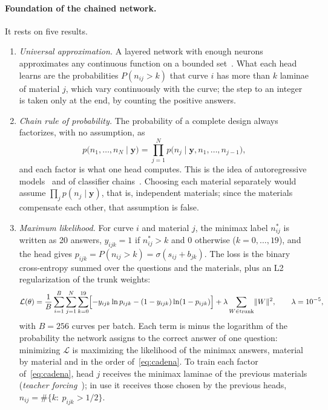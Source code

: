 \paragraph{Foundation of the chained network.} It rests on five results.
\begin{enumerate}[label=(\alph*)]
\item \emph{Universal approximation.} A layered network with enough neurons approximates any continuous function on a bounded set~\cite{cybenko,hornik,leshno}. What each head learns are the probabilities $P(n_{ij}>k)$ that curve $i$ has more than $k$ laminae of material $j$, which vary continuously with the curve; the step to an integer is taken only at the end, by counting the positive answers.
\item \emph{Chain rule of probability.} The probability of a complete design always factorizes, with no assumption, as
\begin{equation}\label{eq:cadena}
p\bigl(n_{1},\dots,n_{N}\mid\mathbf{y}\bigr)=\prod_{j=1}^{N}p\bigl(n_{j}\mid\mathbf{y},n_{1},\dots,n_{j-1}\bigr),
\end{equation}
and each factor is what one head computes. This is the idea of autoregressive models~\cite{larochelle} and of classifier chains~\cite{read11}. Choosing each material separately would assume $\prod_j p(n_j\mid\mathbf{y})$, that is, independent materials; since the materials compensate each other, that assumption is false.
\item \emph{Maximum likelihood.} For curve $i$ and material $j$, the minimax label $n^{*}_{ij}$ is written as 20 answers, $y_{ijk}=1$ if $n^{*}_{ij}>k$ and 0 otherwise ($k=0,\ldots,19$), and the head gives $p_{ijk}=P(n_{ij}>k)=\sigma(s_{ij}+b_{jk})$. The loss is the binary cross-entropy summed over the questions and the materials, plus an L2 regularization of the trunk weights:
\begin{equation}\label{eq:perdida}
\mathcal{L}(\theta)=\frac{1}{B}\sum_{i=1}^{B}\sum_{j=1}^{N}\sum_{k=0}^{19}\Bigl[-y_{ijk}\ln p_{ijk}-(1-y_{ijk})\ln(1-p_{ijk})\Bigr]+\lambda\sum_{W\in\text{trunk}}\lVert W\rVert^{2},\qquad \lambda=10^{-5},
\end{equation}
with $B=256$ curves per batch. Each term is minus the logarithm of the probability the network assigns to the correct answer of one question: minimizing $\mathcal{L}$ is maximizing the likelihood of the minimax answers, material by material and in the order of~\eqref{eq:cadena}. To train each factor of~\eqref{eq:cadena}, head $j$ receives the minimax laminae of the previous materials (\emph{teacher forcing}~\cite{williams}); in use it receives those chosen by the previous heads, $\hat n_{ij}=\#\{k:\ p_{ijk}>1/2\}$.

\end{enumerate}
